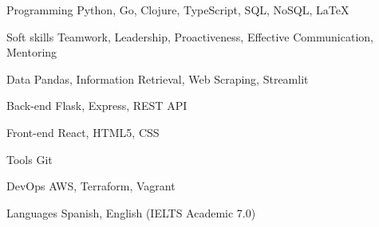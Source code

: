 

\begin{cvskills}

  \cvskill
    {Programming} %
    {Python, Go, Clojure, TypeScript, SQL, NoSQL, \LaTeX} %
    
  \cvskill
    {Soft skills} %
    {Teamwork, Leadership, Proactiveness, Effective Communication, Mentoring} %
    
  \cvskill
    {Data} %
    {Pandas, Information Retrieval, Web Scraping, Streamlit} %

  \cvskill
    {Back-end} %
    {Flask, Express, REST API} %

  \cvskill
    {Front-end} %
    {React, HTML5, CSS} %
    
  \cvskill
    {Tools} %
    {Git} %

  \cvskill
    {DevOps} %
    {AWS, Terraform, Vagrant} %

  \cvskill
    {Languages} %
    {Spanish, English (IELTS Academic 7.0)} %

\end{cvskills}
